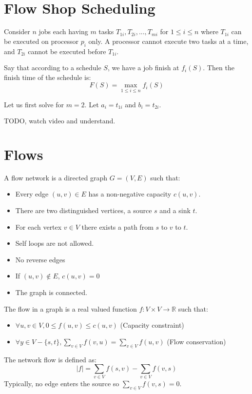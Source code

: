\documentclass[12pt,letterpaper]{article}
\theoremstyle{definition}
\newcommand{\R}{\mathbb{R}}
\begin{document}
\section{Flow Shop Scheduling}

Consider $n$ jobs each having $m$ tasks $T_{1i}, T_{2i}, ... , T_{mi}$ for $1 \leq i \leq n$ where $T_{1i}$ can be executed on processor $p_i$ only. A processor cannot execute two tasks at a time, and $T_{2i}$ cannot be executed before $T_{1i}$.

Say that according to a schedule $S$, we have a job finish at $f_i(S)$. Then the finish time of the schedule is:
\[F(S) = \max_{1 \leq i \leq n} f_i(S)\]

Let us first solve for $m=2$. Let $a_i = t_{1i}$ and $b_i = t_{2i}$.

TODO, watch video and understand.

\section{Flows}

A flow network is a directed graph $G = (V,E)$ such that:

\begin{itemize}
  \item Every edge $(u,v) \in E$ has a non-negative capacity $c(u,v)$.
  \item There are two distinguished vertices, a source $s$ and a sink $t$.
  \item For each vertex $v \in V$ there exists a path from $s$ to $v$ to $t$.
  \item Self loops are not allowed.
  \item No reverse edges
  \item If $(u,v) \notin E$, $c(u,v) = 0$
  \item The graph is connected.
\end{itemize}

The flow in a graph is a real valued function $f : V \times V \rightarrow \R$ such that:

\begin{itemize}
  \item $\forall u, v \in V, 0 \leq f(u,v) \leq c(u,v)$ (Capacity constraint)
  \item $\forall y \in V - \{s,t\}, \sum_{v \in V} f(v,u) = \sum_{v \in V} f(u,v)$ (Flow conservation)
\end{itemize}

The network flow is defined as:
\[|f| = \sum_{v \in V} f(s,v) - \sum_{v \in V} f(v,s)\]
Typically, no edge enters the source so $\sum_{v \in V} f(v,s) = 0$.
\end{document}

